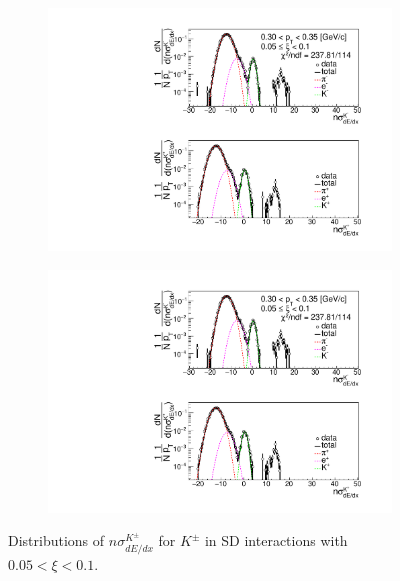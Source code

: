\begin{figure}[h!]
\begin{subfigure}{.3\textwidth}
		\includegraphics[width=\linewidth, page=6]{chapters/chrgSTAR/img/dEdx/fit2019_thirdStep_1_1.pdf}
	\end{subfigure}
	\begin{subfigure}{.33\textwidth}
		\includegraphics[width=\linewidth, page=7]{chapters/chrgSTAR/img/dEdx/fit2019_thirdStep_1_1.pdf}
	\end{subfigure}
	\caption[Distributions of $n\sigma^{K^\pm}_{dE/dx}$ for $K^\pm$ in SD interactions with $0.05 < \xi<0.1$]{Distributions of $n\sigma^{K^\pm}_{dE/dx}$ for $K^\pm$ in SD interactions with $0.05 < \xi<0.1$.}
	\label{fig:nsigmaKfit_1}
\end{figure}

